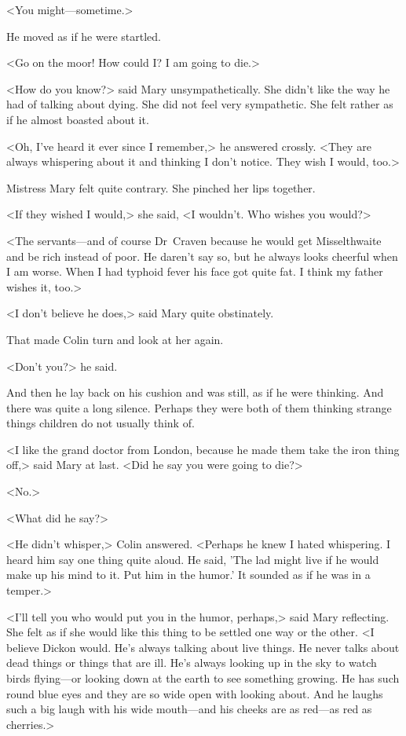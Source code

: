 <You might—sometime.>

He moved as if he were startled.

<Go on the moor! How could I\@? I am going to die.>

<How do you know?> said Mary unsympathetically. She didn't like the way he had of talking about dying. She did not feel very sympathetic. She felt rather as if he almost boasted about it.

<Oh, I've heard it ever since I remember,> he answered crossly. <They are always whispering about it and thinking I don't notice. They wish I would, too.>

Mistress Mary felt quite contrary. She pinched her lips together.

<If they wished I would,> she said, <I wouldn't. Who wishes you would?>

<The servants—and of course Dr~Craven because he would get Misselthwaite and be rich instead of poor. He daren't say so, but he always looks cheerful when I am worse. When I had typhoid fever his face got quite fat. I think my father wishes it, too.>

<I don't believe he does,> said Mary quite obstinately.

That made Colin turn and look at her again.

<Don't you?> he said.

And then he lay back on his cushion and was still, as if he were thinking. And there was quite a long silence. Perhaps they were both of them thinking strange things children do not usually think of.

<I like the grand doctor from London, because he made them take the iron thing off,> said Mary at last. <Did he say you were going to die?>

<No.>

<What did he say?>

<He didn't whisper,> Colin answered. <Perhaps he knew I hated whispering. I heard him say one thing quite aloud. He said, 'The lad might live if he would make up his mind to it. Put him in the humor.' It sounded as if he was in a temper.>

<I'll tell you who would put you in the humor, perhaps,> said Mary reflecting. She felt as if she would like this thing to be settled one way or the other. <I believe Dickon would. He's always talking about live things. He never talks about dead things or things that are ill. He's always looking up in the sky to watch birds flying—or looking down at the earth to see something growing. He has such round blue eyes and they are so wide open with looking about. And he laughs such a big laugh with his wide mouth—and his cheeks are as red—as red as cherries.>


